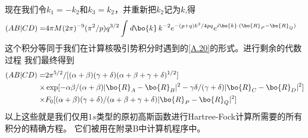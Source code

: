 现在我们令$k_1=-k_2$和$k_3=k_2$，并重新把$k_2$记为$k$,得
\begin{align}
	\label{A.40}
	(AB|CD)=&4\pi M(2\pi)^{-9}(\pi^2/p)q^{3/2}\int\emph{d}\bo{k}\,
	k^{-2}e^{-(p+q)k^2/4pq}e^{i\bo{k}\cdot(\bo{R}_P-\bo{R}_Q)}
\end{align}
这个积分等同于我们在计算核吸引势积分时遇到的\autoref{A.20}的形式。进行剩余的代数过程
我们最终得到
\begin{align}
	\label{A.41}
	(AB|CD)=&2\pi ^{5/2}/[(\alpha+\beta)(\gamma+\delta)(\alpha+\beta+\gamma+\delta)^{1/2}]
	\nonumber\\
	\times&\exp[-\alpha\beta/(\alpha+\beta)|\bo{R}_A-\bo{R}_B|^2-\gamma\delta/(\gamma+\delta)|\bo{R}_C-\bo{R}_D|^2]
	\nonumber\\
	\times&F_0[(\alpha+\beta)(\gamma+\delta)/(\alpha+\beta+\gamma+\delta)|\bo{R}_P-\bo{R}_Q|^2]
\end{align}
以上这些就是我们仅用$1s$类型的原初高斯函数进行Hartree-Fock计算所需要的所有积分的精确方程。
它们被用在附录B中计算机程序中。

\newpage
\theendnotes
{}
